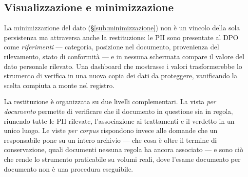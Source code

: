 \subsection{Visualizzazione e minimizzazione} La minimizzazione del dato (§\ref{sub:minimizzazione}) non è un vincolo della sola persistenza ma attraversa anche la restituzione: le PII sono presentate al DPO come \emph{riferimenti} --- categoria, posizione nel documento, provenienza del rilevamento, stato di conformità --- e in nessuna schermata compare il valore del dato personale rilevato. Una dashboard che mostrasse i valori trasformerebbe lo strumento di verifica in una nuova copia dei dati da proteggere, vanificando la scelta compiuta a monte nel registro. \medskip

La restituzione è organizzata su due livelli complementari. La vista \emph{per documento} permette di verificare che il documento in questione sia in regola, riunendo tutte le PII rilevate, l'associazione ai trattamenti e il verdetto in un unico luogo. Le viste \emph{per corpus} rispondono invece alle domande che un responsabile pone su un intero archivio --- che cosa è oltre il termine di conservazione, quali documenti nessuna regola ha ancora associato --- e sono ciò che rende lo strumento praticabile su volumi reali, dove l'esame documento per documento non è una procedura eseguibile.